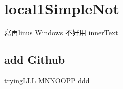 
\chapter{local1SimpleNot}
寫再linus Windows 不好用
innerText

\section{add Github}
tryingLLL
MNNOOPP
ddd